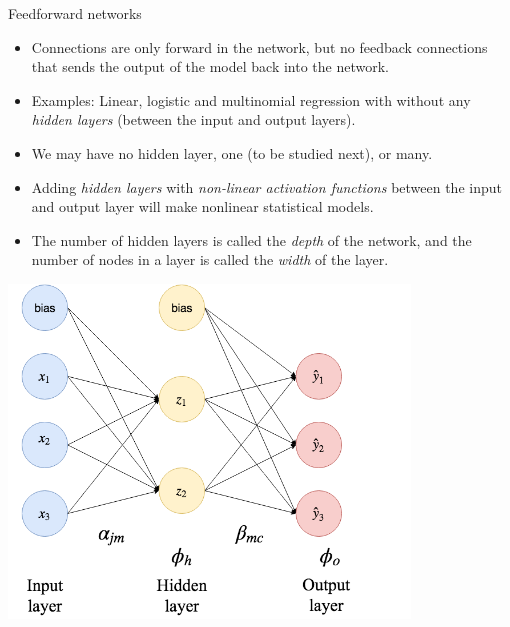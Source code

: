 \documentclass[10pt,ignorenonframetext,]{beamer}
\begin{document}
\begin{frame}{Feedforward networks}
\protect\hypertarget{feedforward-networks}{}

\begin{itemize}
\item
  Connections are only forward in the network, but no feedback
  connections that sends the output of the model back into the network.
\item
  Examples: Linear, logistic and multinomial regression with without any
  \emph{hidden layers} (between the input and output layers).
\item
  We may have no hidden layer, one (to be studied next), or many.
\item
  Adding \emph{hidden layers} with \emph{non-linear activation
  functions} between the input and output layer will make nonlinear
  statistical models.
\item
  The number of hidden layers is called the \emph{depth} of the network,
  and the number of nodes in a layer is called the \emph{width} of the
  layer.
\end{itemize}

\end{frame}

\begin{frame}

\centering

\includegraphics[width=0.8\textwidth,height=\textheight]{drawNNp3h2o3.png}

\end{frame}
\end{document}
